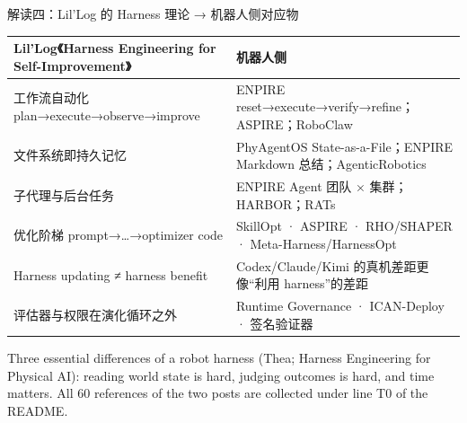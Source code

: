 \documentclass[aspectratio=169,10pt]{beamer}
\newcommand{\en}[1]{{\footnotesize\textcolor{neutral}{#1}}}
\begin{document}
\begin{frame}{解读四：Lil'Log 的 Harness 理论 → 机器人侧对应物}
\begin{center}
\vspace{4pt}
\small
\begin{tabular}{@{}p{5.0cm}p{7.9cm}@{}}
\toprule
Lil'Log《Harness Engineering for Self-Improvement》 & 机器人侧 \\
\midrule
工作流自动化 plan→execute→observe→improve & ENPIRE reset→execute→verify→refine；ASPIRE；RoboClaw \\
文件系统即持久记忆 & PhyAgentOS State-as-a-File；ENPIRE Markdown 总结；AgenticRobotics \\
子代理与后台任务 & ENPIRE Agent 团队 × 集群；HARBOR；RATs \\
优化阶梯 prompt→…→optimizer code & SkillOpt · ASPIRE · RHO/SHAPER · Meta-Harness/HarnessOpt \\
Harness updating ≠ harness benefit & Codex/Claude/Kimi 的真机差距更像“利用 harness”的差距 \\
评估器与权限在演化循环之外 & Runtime Governance · ICAN-Deploy · 签名验证器 \\
\bottomrule
\end{tabular}
\end{center}
\en{Three essential differences of a robot harness (Thea; Harness Engineering for Physical AI): reading world state is hard, judging outcomes is hard, and time matters. All 60 references of the two posts are collected under line T0 of the README.}
\end{frame}
\end{document}
